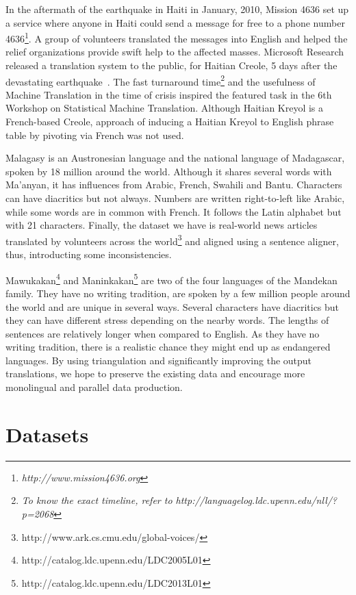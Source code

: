 In the aftermath of the earthquake in Haiti in January, 2010, Mission 4636 set up a service where anyone in Haiti could send a message for free to a phone number 4636\footnote{\emph{http://www.mission4636.org}}. A group of volunteers translated the messages into English and helped the relief organizations provide swift help to the affected masses. Microsoft Research released a translation system to the public, for Haitian Creole, 5 days after the devastating earthquake~\cite{Lewis:11}. The fast turnaround time\footnote{\emph{To know the exact timeline, refer to http://languagelog.ldc.upenn.edu/nll/?p=2068}} and the usefulness of Machine Translation in the time of crisis inspired the featured task in the 6th Workshop on Statistical Machine Translation. Although Haitian Kreyol is a French-based Creole, approach of inducing a Haitian Kreyol to English phrase table by pivoting via French was not used.

Malagasy is an Austronesian language and the national language of Madagascar, spoken by 18 million around the world. Although it shares several words with Ma'anyan, it has influences from Arabic, French, Swahili and Bantu. Characters can have diacritics but not always. Numbers are written right-to-left like Arabic, while some words are in common with French. It follows the Latin alphabet but with 21 characters. Finally, the dataset we have is real-world news articles translated by volunteers across the world\footnote{http://www.ark.cs.cmu.edu/global-voices/} and aligned using a sentence aligner, thus, introducting some inconsistencies. 

Mawukakan\footnote{http://catalog.ldc.upenn.edu/LDC2005L01} and Maninkakan\footnote{http://catalog.ldc.upenn.edu/LDC2013L01} are two of the four languages of the Mandekan family. They have no writing tradition, are spoken by a few million people around the world and are unique in several ways. Several characters have diacritics but they can have different stress depending on the nearby words. The lengths of sentences are relatively longer when compared to English. As they have no writing tradition, there is a realistic chance they might end up as endangered languages. By using triangulation and significantly improving the output translations, we hope to preserve the existing data and encourage more monolingual and parallel data production. 

\section{Datasets}
\label{sec:datasets}

